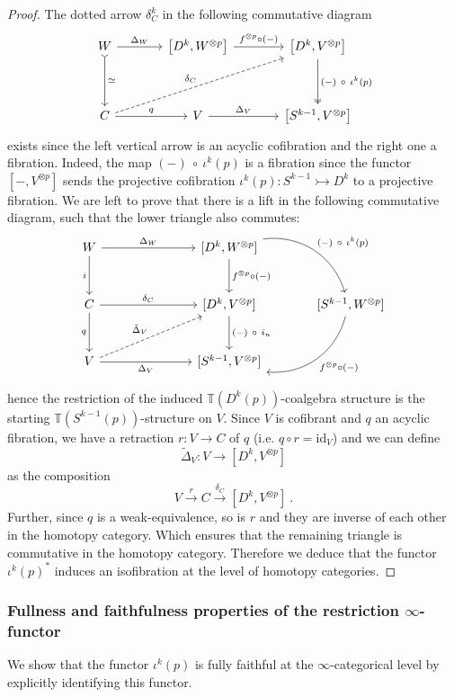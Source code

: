 \documentclass{proc-l}
\theoremstyle{plain}
\theoremstyle{definition}
\theoremstyle{remark}
\begin{document}
\begin{proof}
The dotted arrow $\delta^k_C$ in the following commutative diagram
\[
\begin{tikzcd}[column sep=3pc,row sep=3pc]
W \arrow[d,rightarrowtail,"\simeq"] \arrow[r,"\Delta_W"]
&\left[ D^k, W^{\otimes p}\right] \arrow[r,"f^{\otimes p} \circ (-)"]
&\left[ D^k, V^{\otimes p}\right] \arrow[d,"(-)~ \circ ~ \iota^k(p)",two heads] \\
C \arrow[r,"q"] \arrow[rru,"\delta_C",dashed]
&V \arrow[r,"\Delta_V"]
&\left[ S^{k-1},V^{\otimes p}\right]
\end{tikzcd}
\]
exists since the left vertical arrow is an acyclic cofibration and the right one a fibration. Indeed, the map $(-)~ \circ ~ \iota^k(p)$ is a fibration since the functor $\left[-,V^{\otimes p}\right]$ sends the projective cofibration $\iota^k(p): S^{k-1} \rightarrowtail D^k$ to a projective fibration. We are left to prove that there is a lift in the following commutative diagram, such that the lower triangle also commutes:
\[
\begin{tikzcd}[row sep=large, column sep=large]
W
\arrow[rr, "\Delta_W"]
\arrow[d, "i"']
&& {[D^k, W^{\otimes p}]}
\arrow[d, "f^{\otimes p}\circ (-)"]
\arrow[rd, "(-)~\circ ~\iota^k(p)", bend left=40] & \\
C
\arrow[d, "q"']
\arrow[rr, "\delta_C"]
&& {[D^k, V^{\otimes p}]}
\arrow[d, "(-)~\circ~i_n"]
& {[S^{k-1}, W^{\otimes p}]}
\arrow[ld, "f^{\otimes p}\circ (-)", bend left=40] \\
V
\arrow[rr, "\Delta_V"']
\arrow[urr, dashed, "\tilde{\Delta}_V"]
&& {[S^{k-1}, V^{\otimes p}]}
\end{tikzcd}
\]

hence the restriction of the induced $\mathbb{T}(D^k(p))$-coalgebra structure is the starting $\mathbb{T}(S^{k-1}(p))$-structure on $V$. Since $V$ is cofibrant and $q$ an acyclic fibration, we have a retraction $r: V \longrightarrow C$ of $q$ (i.e. $q \circ r = \mathrm{id}_{V}$) and we can define
\[
\tilde{\Delta}_V : V \longrightarrow \left[ D^k,V^{\otimes p} \right]
\]
as the composition
\[
V\stackrel{r}\longrightarrow C \stackrel{\delta_C}\longrightarrow  \left[ D^k,V^{\otimes p}\right]~.
\]
Further, since $q$ is a weak-equivalence, so is $r$ and they are inverse of each other in the homotopy category. Which ensures that the remaining triangle is commutative in the homotopy category. Therefore we deduce that the functor $\iota^k(p)^*$ induces an isofibration at the level of homotopy categories.
\end{proof}

\subsubsection{Fullness and faithfulness properties of the restriction $\infty$-functor}%
\label{Section:4.4.2} We show that the functor $\iota^k(p)$ is fully faithful at the $\infty$-categorical level by explicitly identifying this functor.
\end{document}
